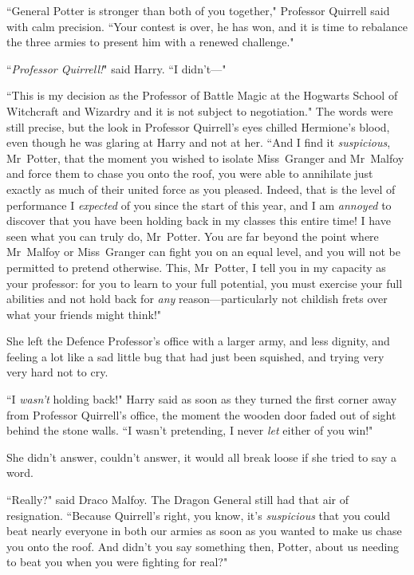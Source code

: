 ``General Potter is stronger than both of you together," Professor Quirrell said with calm precision. ``Your contest is over, he has won, and it is time to rebalance the three armies to present him with a renewed challenge."

``\emph{Professor Quirrell!}" said Harry. ``I didn't—"

``This is my decision as the Professor of Battle Magic at the Hogwarts School of Witchcraft and Wizardry and it is not subject to negotiation." The words were still precise, but the look in Professor Quirrell's eyes chilled Hermione's blood, even though he was glaring at Harry and not at her. ``And I find it \emph{suspicious}, Mr~Potter, that the moment you wished to isolate Miss~Granger and Mr~Malfoy and force them to chase you onto the roof, you were able to annihilate just exactly as much of their united force as you pleased. Indeed, that is the level of performance I \emph{expected} of you since the start of this year, and I am \emph{annoyed} to discover that you have been holding back in my classes this entire time! I have seen what you can truly do, Mr~Potter. You are far beyond the point where Mr~Malfoy or Miss~Granger can fight you on an equal level, and you will not be permitted to pretend otherwise. This, Mr~Potter, I tell you in my capacity as your professor: for you to learn to your full potential, you must exercise your full abilities and not hold back for \emph{any} reason—particularly not childish frets over what your friends might think!"

\later

She left the Defence Professor's office with a larger army, and less dignity, and feeling a lot like a sad little bug that had just been squished, and trying very very hard not to cry.

``I \emph{wasn't} holding back!" Harry said as soon as they turned the first corner away from Professor Quirrell's office, the moment the wooden door faded out of sight behind the stone walls. ``I wasn't pretending, I never \emph{let} either of you win!"

She didn't answer, couldn't answer, it would all break loose if she tried to say a word.

``Really?" said Draco Malfoy. The Dragon General still had that air of resignation. ``Because Quirrell's right, you know, it's \emph{suspicious} that you could beat nearly everyone in both our armies as soon as you wanted to make us chase you onto the roof. And didn't you say something then, Potter, about us needing to beat you when you were fighting for real?"

